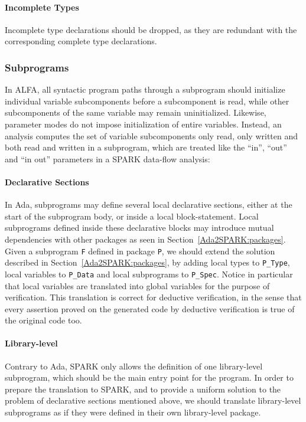 \documentclass{article}
\begin{document}
\paragraph{Incomplete Types}

Incomplete type declarations should be dropped, as they are redundant with the
corresponding complete type declarations.

\subsubsection{Subprograms}
\label{Ada2SPARK:subprograms}

 In ALFA, all syntactic
program paths through a subprogram should initialize individual variable
subcomponents before a subcomponent is read, while other subcomponents of the
same variable may remain uninitialized. Likewise, parameter modes do not impose
initialization of entire variables. Instead, an analysis computes the set of
variable subcomponents only read, only written and both read and written in a
subprogram, which are treated like the ``in'', ``out'' and ``in out''
parameters in a SPARK data-flow analysis:

\paragraph{Declarative Sections}

In Ada, subprograms may define several local declarative sections, either at
the start of the subprogram body, or inside a local block-statement. Local
subprograms defined inside these declarative blocks may introduce mutual
dependencies with other packages as seen in
Section~\ref{Ada2SPARK:packages}. Given a subprogram \verb|F| defined in
package \verb|P|, we should extend the solution described in
Section~\ref{Ada2SPARK:packages}, by adding local types to \verb|P_Type|, local
variables to \verb|P_Data| and local subprograms to \verb|P_Spec|. Notice in
particular that local variables are translated into global variables for the
purpose of verification. This translation is correct for deductive
verification, in the sense that every assertion proved on the generated code by
deductive verification is true of the original code too.

\paragraph{Library-level}

Contrary to Ada, SPARK only allows the definition of one library-level
subprogram, which should be the main entry point for the program. In order to
prepare the translation to SPARK, and to provide a uniform solution to the
problem of declarative sections mentioned above, we should translate
library-level subprograms as if they were defined in their own library-level
package.
\end{document}
